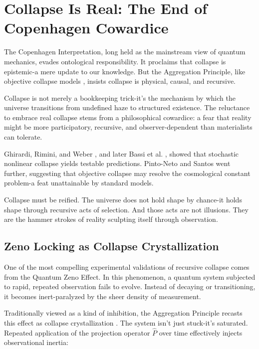 \section{Collapse Is Real: The End of Copenhagen Cowardice}

The Copenhagen Interpretation, long held as the mainstream view of quantum mechanics, evades ontological responsibility. It proclaims that collapse is epistemic-a mere update to our knowledge. But the Aggregation Principle, like objective collapse models \cite{aggregation_decoherence_core}, insists collapse is physical, causal, and recursive.

Collapse is not merely a bookkeeping trick-it’s the  mechanism  by which the universe transitions from undefined haze to structured existence. The reluctance to embrace real collapse stems from a philosophical cowardice: a fear that reality might be more participatory, recursive, and observer-dependent than materialists can tolerate.

Ghirardi, Rimini, and Weber \cite{aggregation_decoherence_core}, and later Bassi et al. \cite{aggregation_decoherence_core}, showed that stochastic nonlinear collapse yields testable predictions. Pinto-Neto and Santos \cite{aggregation_decoherence_core} went further, suggesting that objective collapse may resolve the cosmological constant problem-a feat unattainable by standard models.

Collapse must be reified. The universe does not hold shape by chance-it holds shape through recursive acts of selection. And those acts are not illusions. They are the hammer strokes of reality sculpting itself through observation.

\subsection{Zeno Locking as Collapse Crystallization}

One of the most compelling experimental validations of recursive collapse comes from the Quantum Zeno Effect. In this phenomenon, a quantum system subjected to rapid, repeated observation fails to evolve. Instead of decaying or transitioning, it becomes inert-paralyzed by the sheer density of measurement.

Traditionally viewed as a kind of inhibition, the Aggregation Principle recasts this effect as  collapse crystallization . The system isn't just stuck-it's saturated. Repeated application of the projection operator \( \hat{P} \) over time effectively injects observational inertia:

